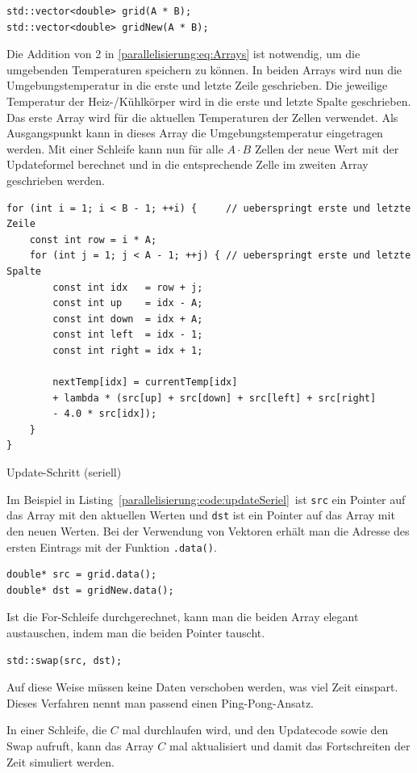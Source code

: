 \begin{lstlisting}
std::vector<double> grid(A * B);
std::vector<double> gridNew(A * B);
\end{lstlisting}
Die Addition von 2 in \eqref{parallelisierung:eq:Arrays} ist notwendig, um die umgebenden Temperaturen speichern zu können.
In beiden Arrays wird nun die Umgebungstemperatur in die erste und letzte Zeile geschrieben.
Die jeweilige Temperatur der Heiz-/Kühlkörper wird in die erste und letzte Spalte geschrieben.
Das erste Array wird für die aktuellen Temperaturen der Zellen verwendet.
Als Ausgangspunkt kann in dieses Array die Umgebungstemperatur eingetragen werden.
Mit einer Schleife kann nun für alle $A \cdot B$ Zellen der neue Wert mit der Updateformel berechnet und in die entsprechende Zelle im zweiten Array geschrieben werden.
\begin{lstfloat}
\lstset{frame=none}
\begin{lstlisting}
for (int i = 1; i < B - 1; ++i) {     // ueberspringt erste und letzte Zeile
	const int row = i * A;
	for (int j = 1; j < A - 1; ++j) { // ueberspringt erste und letzte Spalte
		const int idx   = row + j;
		const int up    = idx - A;
		const int down  = idx + A;
		const int left  = idx - 1;
		const int right = idx + 1;
		
		nextTemp[idx] = currentTemp[idx]
		+ lambda * (src[up] + src[down] + src[left] + src[right]
		- 4.0 * src[idx]);
	}
}
\end{lstlisting}
\caption{Update-Schritt (seriell)
\label{parallelisierung:code:updateSeriel}}
\end{lstfloat}
Im Beispiel in Listing~\ref{parallelisierung:code:updateSeriel} ist \texttt{src} ein Pointer auf das Array mit den aktuellen Werten und \texttt{dst} ist ein Pointer auf das Array mit den neuen Werten.
Bei der Verwendung von Vektoren erhält man die Adresse des ersten Eintrags mit der Funktion \texttt{.data()}.
\begin{lstlisting}
double* src = grid.data();
double* dst = gridNew.data();
\end{lstlisting}

Ist die For-Schleife durchgerechnet, kann man die beiden Array elegant austauschen, indem man die beiden Pointer tauscht.
\begin{lstlisting}
std::swap(src, dst);
\end{lstlisting}
Auf diese Weise müssen keine Daten verschoben werden, was viel Zeit einspart.
Dieses Verfahren nennt man passend einen Ping-Pong-Ansatz.

In einer Schleife, die $C$ mal durchlaufen wird, und den Updatecode sowie den Swap aufruft, kann das Array $C$ mal aktualisiert und damit das Fortschreiten der Zeit simuliert werden.

